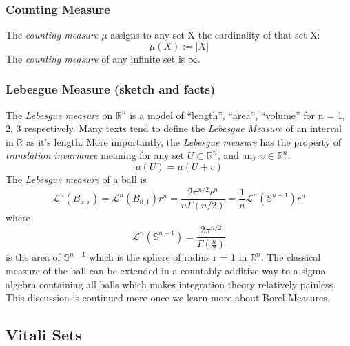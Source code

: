 \documentclass{article}
\begin{document}
\subsubsection{Counting Measure}
The \emph{counting measure} $\mu$ assigns to any set X the cardinality of that set X: 
\[
\mu(X) :=|X|
\]
The \emph{counting measure} of any infinite set is $\infty$.

\subsubsection{Lebesgue Measure (sketch and facts)}
The \textit{Lebesgue measure} on $\mathbb{R}^n$ is a model of ``length'', ``area'', ``volume'' for n = 1, 2, 3 respectively. Many texts tend to define the \textit{Lebesgue Measure} of an interval in $\mathbb{R}$ as it's length. More importantly, the \textit{Lebesgue measure} has the property of \emph{translation invariance} meaning for any set $U\subset \mathbb{R}^n$, and any $v\in\mathbb{R}^n$: 
\[
\mu(U)=\mu(U+v)
\]
The \emph{Lebesgue measure} of a ball is 
\[
\mathcal{L}^n(B_{x,r})=\mathcal{L}^n(B_{0,1})r^n=\frac{2\pi^{n/2}r^n}{n\Gamma(n/2)}=\frac{1}{n}\mathcal{L}^n(\mathbb{S}^{n-1})r^n
\]
where 
\[
\mathcal{L}^n(\mathbb{S}^{n-1})= \frac{2\pi^{n/2}}{\Gamma(\frac{n}{2})}
\]
is the area of $\mathbb{S}^{n-1}$ which is the sphere of radius r = 1 in $\mathbb{R}^n.$ The classical measure of the ball can be extended in a countably additive way to a sigma algebra containing all balls which makes integration theory relatively painless. \newline \newline
This discussion is continued more once we learn more about Borel Measures.

\subsection{Vitali Sets}
\end{document}
